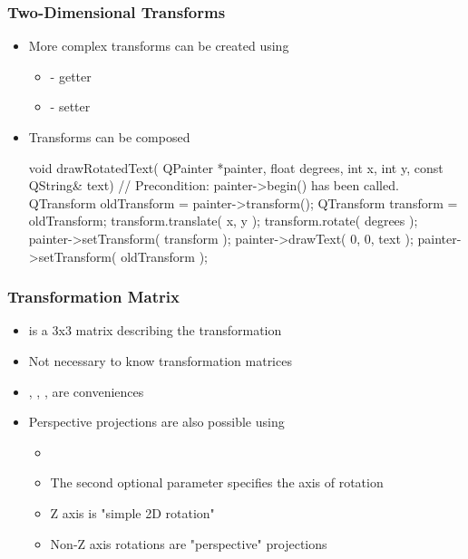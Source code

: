 \begin{slide}[fragile]\frametitle{Two-Dimensional Transforms}
\begin{itemize}
\item More complex transforms can be created using 
  \begin{itemize}
  \item {} - getter
  \item {} - setter
  \end{itemize}
\item Transforms can be composed
\begin{cpp}
void drawRotatedText( QPainter *painter, float degrees,
int x, int y, const QString& text)
{
    // Precondition: painter->begin() has been called.
    QTransform oldTransform = painter->transform();
    QTransform transform = oldTransform;
    transform.translate( x, y );
    transform.rotate( degrees );
    painter->setTransform( transform );
    painter->drawText( 0, 0, text );
    painter->setTransform( oldTransform );
}
\end{cpp}
\end{itemize}
\end{slide}

\begin{slide}[fragile]\frametitle{Transformation Matrix}
\begin{itemize}
\item {} is a 3x3 matrix describing the transformation
\item Not necessary to know transformation matrices
\item {}, , ,  are conveniences
\item Perspective projections are also possible using 
  \begin{itemize}
  \item {}
  \item The second optional parameter specifies the axis of rotation
  \item Z axis is "simple 2D rotation"
  \item Non-Z axis rotations are "perspective" projections
  \end{itemize}
\end{itemize}
\end{slide}

